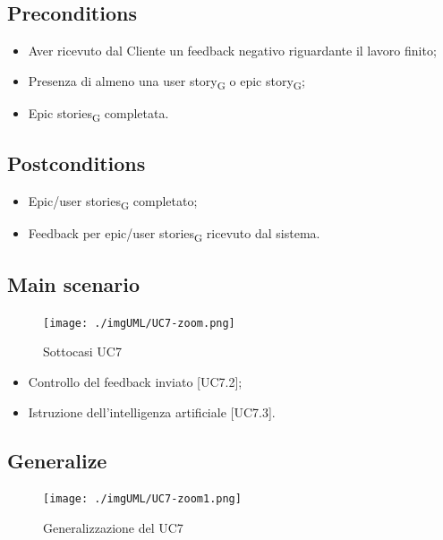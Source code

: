 \documentclass{article}
\begin{document}
    \subsection*{Preconditions}
    \begin{itemize}
        \item Aver ricevuto dal Cliente un feedback negativo riguardante il lavoro finito;
        \item Presenza di almeno una user story\textsubscript{G}  o epic story\textsubscript{G};
        \item Epic stories\textsubscript{G}  completata.
    \end{itemize}
    
    \subsection*{Postconditions}
    \begin{itemize}
        \item Epic/user stories\textsubscript{G}  completato;
        \item Feedback per epic/user stories\textsubscript{G}  ricevuto dal sistema.
    \end{itemize}
    
    \subsection*{Main scenario}
        \begin{figure}[h]
            \centering
            \texttt{[image: ./imgUML/UC7-zoom.png]}
            \caption{Sottocasi UC7}
            \label{fig:UC7_sottocasi}
        \end{figure}
        \begin{itemize}
            \item Controllo del feedback inviato [UC7.2];
            \item Istruzione dell'intelligenza artificiale [UC7.3].
        \end{itemize}
        
    \subsection*{Generalize}
      \begin{figure}[h]
            \centering
            \texttt{[image: ./imgUML/UC7-zoom1.png]}
            \caption{Generalizzazione del UC7}
            \label{fig:UC7_generalizzazione}
        \end{figure}
\end{document}
